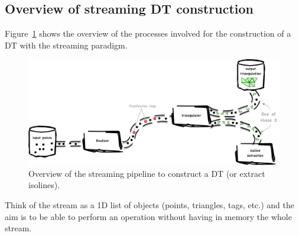 \subsection{Overview of streaming DT construction}
Figure~\ref{fig:streamingdt} shows the overview of the processes involved for the construction of a DT with the streaming paradigm.
\begin{figure}
  \centering
  \includegraphics[width=0.9\linewidth]{figs/streaming_pipeline}
  \caption{Overview of the streaming pipeline to construct a DT (or extract isolines).}%
\label{fig:streamingdt}
\end{figure}
Think of the stream as a 1D list of objects (points, triangles, tags, etc.) and the aim is to be able to perform an operation without having in memory the whole stream.


